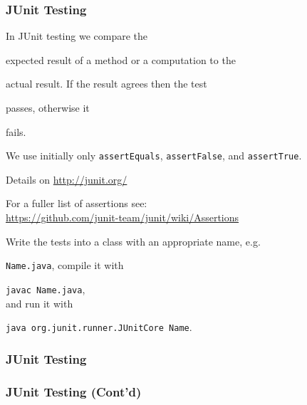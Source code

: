 \documentclass{beamer}
\def\mcolor#1#2{\rule{0ex}{0ex}\color{#1}#2\color{black}{}}
\begin{document}
\begin{frame}
\frametitle{JUnit Testing}

In JUnit testing we compare the \mcolor{blue}{expected result} of a method or a computation to the \mcolor{blue}{actual result}. If the result agrees then the test \mcolor{blue}{passes}, otherwise it \mcolor{blue}{fails}.

We use initially only \texttt{assertEquals}, \texttt{assertFalse}, and
\texttt{assertTrue}.

Details on
\url{http://junit.org/}

For a fuller list of assertions see:\\
\url{https://github.com/junit-team/junit/wiki/Assertions}\bigskip

Write the tests into a class with an appropriate name, e.g.
\mcolor{blue}{\texttt{Name.java}}, compile it with \mcolor{blue}{\texttt{javac Name.java}},\\
and run it with
\mcolor{blue}{\texttt{java org.junit.runner.JUnitCore Name}}.

\end{frame}

\begin{frame}
\frametitle{JUnit Testing}


\end{frame}

\begin{frame}
\frametitle{JUnit Testing (Cont'd)}


\end{frame}
\end{document}
